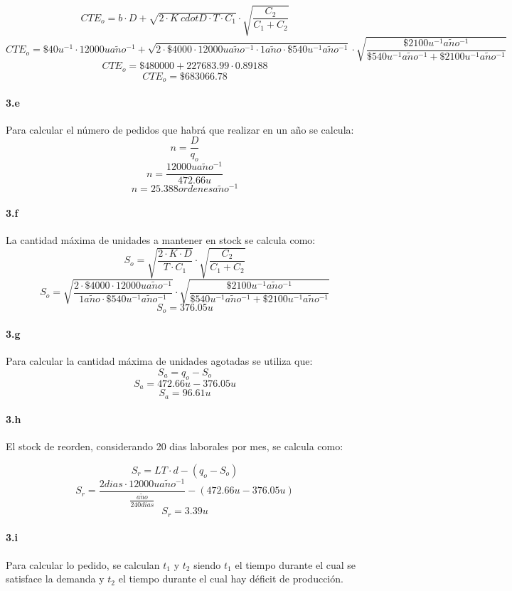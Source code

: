\documentclass[a4paper,10pt]{article}
\def \anio {a\tilde{n}o}
\begin{document}
  $$CTE_o = b \cdot D + \sqrt{2 \cdot K \ cdot D \cdot T \cdot C_1} \cdot \sqrt{\frac{C_2}{C_1 + C_2}} $$
  $$CTE_o = \$40 u^{-1} \cdot 12000 u \anio^{-1} + \sqrt{2 \cdot \$4000 \cdot 12000 u \anio^{-1} \cdot 1 \anio \cdot \$540 u^{-1}\anio^{-1} } \cdot \sqrt{\frac{\$2100 u^{-1}\anio^{-1}}{\$540 u^{-1}\anio^{-1} + \$2100 u^{-1}\anio^{-1}}} $$
  $$CTE_o = \$480000 + 227683.99 \cdot 0.89188 $$ 
  $$\boxed{CTE_o = \$683066.78}$$

  \paragraph{3.e}
  Para calcular el n\'umero de pedidos que habr\'a que realizar en un a\~no se calcula:
  $$n = \frac{D}{q_o} $$
  $$n = \frac{12000 u \anio^{-1}}{472.66 u} $$
  $$\boxed{n = 25.388 ordenes \anio^{-1}} $$

  \paragraph{3.f}
  La cantidad m\'axima de unidades a mantener en stock se calcula como:
  $$S_o = \sqrt{\frac{2 \cdot K \cdot D}{T \cdot C_1}} \cdot \sqrt{\frac{C_2}{C_1 + C_2}} $$
  $$S_o = \sqrt{\frac{2 \cdot \$4000 \cdot 12000 u \anio^{-1}}{1 \anio \cdot \$540 u^{-1}\anio^{-1} }} \cdot \sqrt{\frac{\$2100 u^{-1}\anio^{-1}}{\$540 u^{-1}\anio^{-1} + \$2100 u^{-1}\anio^{-1}}} $$
  $$\boxed{S_o = 376.05 u} $$

  \paragraph{3.g}
  Para calcular la cantidad m\'axima de unidades agotadas se utiliza que:
  $$S_a = q_o - S_o $$
  $$S_a = 472.66 u - 376.05 u $$
  $$\boxed{S_a = 96.61 u } $$

 \paragraph{3.h}
 El stock de reorden, considerando 20 dias laborales por mes, se calcula como:
  
 $$S_r = LT \cdot d - (q_o - S_o) $$
 $$S_r =  \frac{2dias \cdot 12000 u \anio^{-1}}{\frac{\anio}{240 dias}} - ( 472.66 u - 376.05 u) $$
 $$\boxed{S_r = 3.39 u} $$

  \paragraph{3.i}
  Para calcular lo pedido, se calculan $t_1$ y $t_2$ siendo $t_1$ el tiempo durante el cual se satisface la demanda y $t_2$ el tiempo durante el cual hay d\'eficit de producci\'on.
\end{document}
